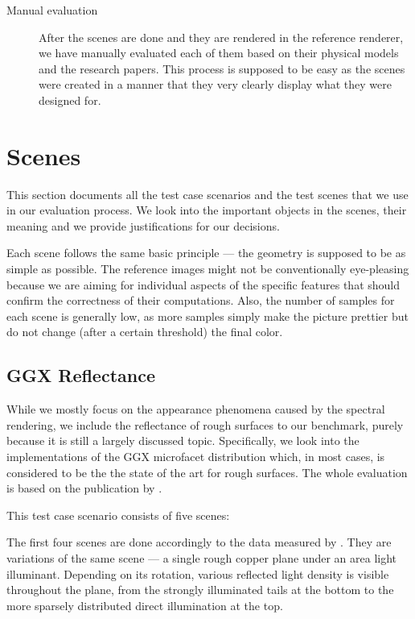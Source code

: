 \begin{description}
	\item[Manual evaluation] After the scenes are done and they are rendered in the reference renderer, we have manually evaluated each of them based on their physical models and the research papers. This process is supposed to be easy as the scenes were created in a manner that they very clearly display what they were designed for.
\end{description}

\section{Scenes}
\label{sec:scenes}

This section documents all the test case scenarios and the test scenes that we use in our evaluation process. We look into the important objects in the scenes, their meaning and we provide justifications for our decisions. 

Each scene follows the same basic principle --- the geometry is supposed to be as simple as possible. The reference images might not be conventionally eye-pleasing because we are aiming for individual aspects of the specific features that should confirm the correctness of their computations. Also, the number of samples for each scene is generally low, as more samples simply make the picture prettier but do not change (after a certain threshold) the final color.

\subsection{GGX Reflectance}

While we mostly focus on the appearance phenomena caused by the spectral rendering, we include the reflectance of rough surfaces to our benchmark, purely because it is still a largely discussed topic. Specifically, we look into the implementations of the GGX microfacet distribution which, in most cases, is considered to be the the state of the art for rough surfaces. The whole evaluation is based on the publication by \citet{walter2007microfacet}.

This test case scenario consists of five scenes:

The first four scenes are done accordingly to the data measured by \citet{walter2007microfacet}. They are variations of the same scene --- a single rough copper plane under an area light illuminant. Depending on its rotation, various reflected light density is visible throughout the plane, from the strongly illuminated tails at the bottom to the more sparsely distributed direct illumination at the top.

